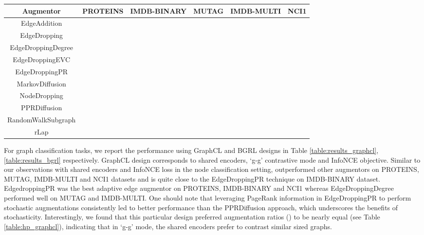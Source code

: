 \documentclass{article}
\theoremstyle{plain}
\theoremstyle{definition}
\theoremstyle{remark}
\begin{document}
\begin{table*}[ht!]
\centering
\caption{Evaluation (in accuracy) on benchmark graph datasets with \textbf{BGRL} based design. }
\label{table:results_bgrl}
\vskip 0.15in
\begin{center}
\begin{small}
\begin{sc}
\begin{tabular}{c|c|c|c|c|c}
\toprule
Augmentor & PROTEINS & IMDB-BINARY & MUTAG &  IMDB-MULTI & NCI1\\
\midrule
EdgeAddition &   &   &   &  &  \\
EdgeDropping &   &  \underline{} &  &  &  \\
EdgeDroppingDegree &  &    &  & \underline{} &  \\
EdgeDroppingEVC &   &   &   &  &  \\
EdgeDroppingPR &   &    &  &   &  \\
MarkovDiffusion &   &    & \underline{} &   &   \\
NodeDropping &    &   &  &  &  \\
PPRDiffusion &   &   &  &   &  \\
RandomWalkSubgraph & \underline{}  & &  &   & \underline{} \\
rLap &  &   &  &  &    \\
\bottomrule
\end{tabular}
\end{sc}
\end{small}
\end{center}
\vskip -0.1in
\end{table*}

For graph classification tasks, we report the performance using GraphCL and BGRL designs in Table \ref{table:results_graphcl}, \ref{table:results_bgrl} respectively. GraphCL design corresponds to shared encoders, `g-g' contrastive mode and InfoNCE objective. Similar to our observations with shared encoders and InfoNCE loss in the node classification setting,  outperformed other augmentors on PROTEINS, MUTAG, IMDB-MULTI and NCI1 datasets and is quite close to the EdgeDroppingPR technique on IMDB-BINARY dataset. EdgedroppingPR was the best adaptive edge augmentor on PROTEINS, IMDB-BINARY and NCI1 whereas EdgeDroppingDegree performed well on MUTAG and IMDB-MULTI. One should note that leveraging PageRank information in EdgeDroppingPR to perform stochastic augmentations consistently led to better performance than the PPRDiffusion approach, which underscores the benefits of stochasticity. Interestingly, we found that this particular design preferred augmentation ratios () to be nearly equal (see Table \ref{table:hp_graphcl}), indicating that in `g-g' mode, the shared encoders prefer to contrast similar sized graphs.
\end{document}
